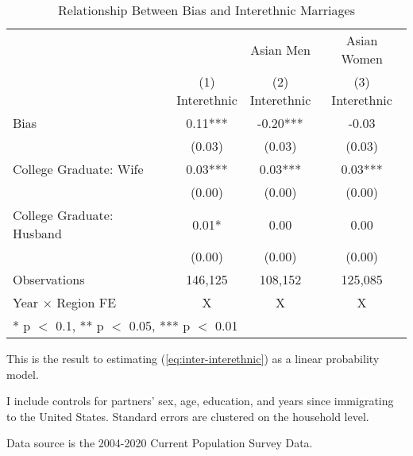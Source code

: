 \begin{table}[H]

\caption{Relationship Between Bias and Interethnic Marriages \label{regtab-logit-02}}
\centering
\begin{threeparttable}
\begin{tabular}[t]{lccc}
\toprule
\multicolumn{2}{c}{ } & \multicolumn{1}{c}{Asian Men} & \multicolumn{1}{c}{Asian Women} \\
\cmidrule(l{3pt}r{3pt}){3-3} \cmidrule(l{3pt}r{3pt}){4-4}
  & \specialcell{(1) \\ Interethnic} & \specialcell{(2) \\ Interethnic} & \specialcell{(3) \\ Interethnic}\\
\midrule
Bias & 0.11*** & -0.20*** & -0.03\\
 & (0.03) & (0.03) & (0.03)\\
College Graduate: Wife & 0.03*** & 0.03*** & 0.03***\\
 & (0.00) & (0.00) & \vphantom{1} (0.00)\\
College Graduate: Husband & 0.01* & 0.00 & 0.00\\
 & (0.00) & (0.00) & (0.00)\\
\midrule
Observations & 146,125 & 108,152 & 125,085\\
Year $\times$ Region FE & X & X & X\\
\bottomrule
\multicolumn{4}{l}{\rule{0pt}{1em}* p $<$ 0.1, ** p $<$ 0.05, *** p $<$ 0.01}\\
\end{tabular}
\begin{tablenotes}
\small
\item[1] \footnotesize{This is the result to estimating (\ref{eq:inter-interethnic}) as a
                      linear probability model.}
\item[2] \footnotesize{I include controls for partners' sex, age, education, 
                      and years since immigrating to the United States.
                      Standard errors are clustered on the household level.}
\item[3] \footnotesize{Data source is the 2004-2020 Current Population Survey Data.}
\end{tablenotes}
\end{threeparttable}
\end{table}
